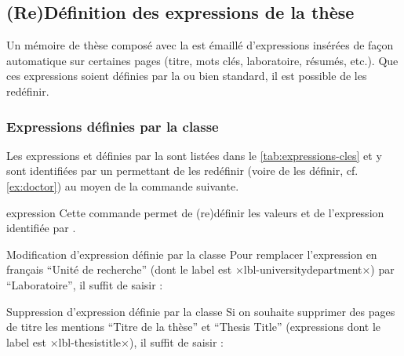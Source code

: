 \subsection{(Re)Définition des expressions de la
  thèse}\label{sec:expressions-cles}

Un mémoire de thèse composé avec la \yatcl est émaillé d'expressions insérées
de façon automatique sur certaines pages (titre, mots clés, laboratoire,
résumés, etc.). Que ces expressions soient définies par la \yatcl ou bien
standard, il est possible de les redéfinir.

\subsubsection{Expressions définies par la classe}
\label{sec:expr-defin-par}

Les expressions  et  définies par la \yatcl
sont listées dans le \vref{tab:expressions-cles} et y sont identifiées par un
 permettant de les redéfinir (voire de les définir, cf.
\vref{ex:doctor}) au moyen de la commande  suivante.
%
\begin{docCommand}{expression}{}
  Cette commande permet de (re)définir les valeurs  et
   de l'expression identifiée par .
\end{docCommand}

\begin{table}
  \centering
  
  \caption{Expressions de la \yatcl (classées par ordre
    alphabétique de leurs valeurs en français) et labels correspondants}
  \label{tab:expressions-cles}
\end{table}

\begin{dbexample}{Modification d'expression définie par la classe}{}
  Pour remplacer l'expression en français \enquote{Unit\'e de recherche} (dont le label est
  ×lbl-universitydepartment×) par \enquote{Laboratoire}, il suffit de
  saisir :
\begin{preamblecode}[title=Par exemple dans le \File{\configurationfile}]
\end{preamblecode}
\end{dbexample}
%
\begin{dbexample}{Suppression d'expression définie par la classe}{}
  Si on souhaite supprimer des pages de titre les mentions \enquote{Titre de la
    thèse} et \foreignquote{english}{Thesis Title} (expressions dont le label
  est ×lbl-thesistitle×), il suffit de saisir :
\begin{preamblecode}[title=Par exemple dans le \File{\configurationfile}]
\end{preamblecode}
\end{dbexample}

